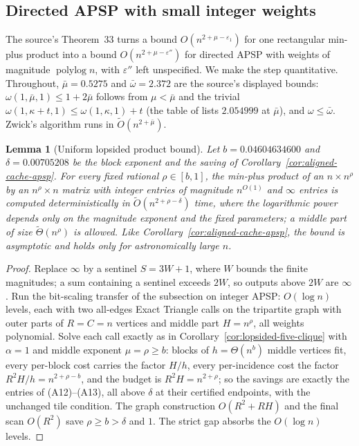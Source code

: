 \documentclass[11pt]{article}
\newtheorem{lemma}[theorem]{Lemma}
\newcommand{\softO}{\widetilde O}
\begin{document}
\subsection*{Directed APSP with small integer weights}
The source's Theorem~33 turns a bound $O(n^{2+\mu-\varepsilon_1})$ for one
rectangular min-plus product into a bound $O(n^{2+\mu-\varepsilon''})$ for
directed APSP with weights of magnitude $\operatorname{polylog}n$, with
$\varepsilon''$ left unspecified. We make the step quantitative. Throughout,
$\bar\mu=0.5275$ and $\bar\omega=2.372$ are the source's displayed bounds:
$\omega(1,\bar\mu,1)\le1+2\bar\mu$ follows from $\mu<\bar\mu$ and the trivial
$\omega(1,\kappa+t,1)\le\omega(1,\kappa,1)+t$ (the table of
\cite{ADVXXZ25} lists $2.054999$ at $\bar\mu$), and $\omega\le\bar\omega$. Zwick's algorithm runs in $\softO(n^{2+\bar\mu})$.

\begin{lemma}[Uniform lopsided product bound]
\label{lem:uniform-lopsided}
Let $b=0.04604634600$ and $\delta=0.00705208$ be the block exponent and the
saving of Corollary~\ref{cor:aligned-cache-apsp}. For every fixed rational
$\rho\in[b,1]$, the min-plus product of an $n\times n^\rho$ by an
$n^\rho\times n$ matrix with integer entries of magnitude $n^{O(1)}$ and
$\infty$ entries is computed deterministically in $\softO(n^{2+\rho-\delta})$
time, where the logarithmic power depends only on the magnitude exponent
and the fixed parameters; a middle part of size $\widetilde\Theta(n^\rho)$ is
allowed. Like Corollary~\ref{cor:aligned-cache-apsp}, the bound is
asymptotic and holds only for astronomically large $n$.
\end{lemma}
\begin{proof}
Replace $\infty$ by a sentinel $S=3W+1$, where $W$ bounds the finite
magnitudes; a sum containing a sentinel exceeds $2W$, so outputs above $2W$
are $\infty$. Run the bit-scaling transfer of the subsection on integer
APSP: $O(\log n)$ levels, each with two all-edges Exact Triangle calls on
the tripartite graph with outer parts of $R=C=n$ vertices and middle part
$H=n^\rho$, all weights polynomial. Solve each call exactly as in
Corollary~\ref{cor:lopsided-five-clique} with $\alpha=1$ and middle
exponent $\mu=\rho\ge b$: blocks of $h=\Theta(n^b)$ middle vertices fit,
every per-block cost carries the factor $H/h$, every per-incidence cost the
factor $R^2H/h=n^{2+\rho-b}$, and the budget is $R^2H=n^{2+\rho}$; so the
savings are exactly the entries of (A12)--(A13), all above $\delta$ at
their certified endpoints, with the unchanged tile condition. The graph
construction $O(R^2+RH)$ and the final scan $O(R^2)$ save $\rho\ge b>\delta$
and $1$. The strict gap absorbs the $O(\log n)$ levels.
\end{proof}
\end{document}
